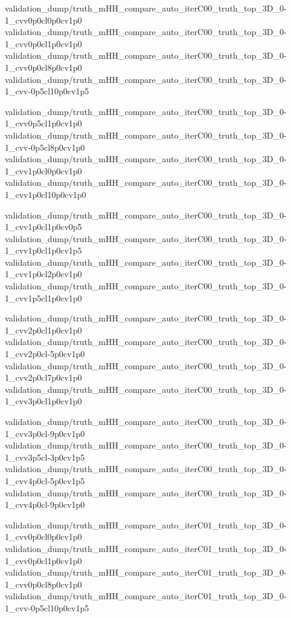 

{validation_dump/truth_mHH_compare_auto_iterC00_truth_top_3D_0-1_cvv0p0cl0p0cv1p0}
{validation_dump/truth_mHH_compare_auto_iterC00_truth_top_3D_0-1_cvv0p0cl1p0cv1p0}
{validation_dump/truth_mHH_compare_auto_iterC00_truth_top_3D_0-1_cvv0p0cl8p0cv1p0}
{validation_dump/truth_mHH_compare_auto_iterC00_truth_top_3D_0-1_cvv-0p5cl10p0cv1p5}

{validation_dump/truth_mHH_compare_auto_iterC00_truth_top_3D_0-1_cvv0p5cl1p0cv1p0}
{validation_dump/truth_mHH_compare_auto_iterC00_truth_top_3D_0-1_cvv-0p5cl8p0cv1p0}
{validation_dump/truth_mHH_compare_auto_iterC00_truth_top_3D_0-1_cvv1p0cl0p0cv1p0}
{validation_dump/truth_mHH_compare_auto_iterC00_truth_top_3D_0-1_cvv1p0cl10p0cv1p0}

{validation_dump/truth_mHH_compare_auto_iterC00_truth_top_3D_0-1_cvv1p0cl1p0cv0p5}
{validation_dump/truth_mHH_compare_auto_iterC00_truth_top_3D_0-1_cvv1p0cl1p0cv1p5}
{validation_dump/truth_mHH_compare_auto_iterC00_truth_top_3D_0-1_cvv1p0cl2p0cv1p0}
{validation_dump/truth_mHH_compare_auto_iterC00_truth_top_3D_0-1_cvv1p5cl1p0cv1p0}

{validation_dump/truth_mHH_compare_auto_iterC00_truth_top_3D_0-1_cvv2p0cl1p0cv1p0}
{validation_dump/truth_mHH_compare_auto_iterC00_truth_top_3D_0-1_cvv2p0cl-5p0cv1p0}
{validation_dump/truth_mHH_compare_auto_iterC00_truth_top_3D_0-1_cvv2p0cl7p0cv1p0}
{validation_dump/truth_mHH_compare_auto_iterC00_truth_top_3D_0-1_cvv3p0cl1p0cv1p0}

{validation_dump/truth_mHH_compare_auto_iterC00_truth_top_3D_0-1_cvv3p0cl-9p0cv1p0}
{validation_dump/truth_mHH_compare_auto_iterC00_truth_top_3D_0-1_cvv3p5cl-3p0cv1p5}
{validation_dump/truth_mHH_compare_auto_iterC00_truth_top_3D_0-1_cvv4p0cl-5p0cv1p5}
{validation_dump/truth_mHH_compare_auto_iterC00_truth_top_3D_0-1_cvv4p0cl-9p0cv1p0}




{validation_dump/truth_mHH_compare_auto_iterC01_truth_top_3D_0-1_cvv0p0cl0p0cv1p0}
{validation_dump/truth_mHH_compare_auto_iterC01_truth_top_3D_0-1_cvv0p0cl1p0cv1p0}
{validation_dump/truth_mHH_compare_auto_iterC01_truth_top_3D_0-1_cvv0p0cl8p0cv1p0}
{validation_dump/truth_mHH_compare_auto_iterC01_truth_top_3D_0-1_cvv-0p5cl10p0cv1p5}

